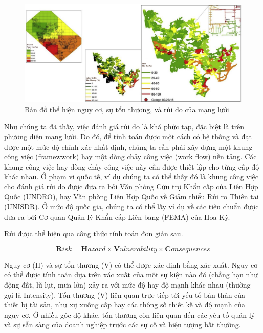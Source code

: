 \documentclass[utf8]{frontiersSCNS} %
\begin{document}
\FloatBarrier
\begin{figure}[h]
	\centering
	\begin{center}
		\includegraphics[width=15cm]{ruido}%
	\end{center}
	\caption{Bản đồ thể hiện nguy cơ, sự tổn thương, và rủi do của mạng lưới}\label{fig:2}
\end{figure}
\FloatBarrier

Như chúng ta đã thấy, việc đánh giá rủi do là khá phức tạp, đặc biệt là trên phương diện mạng lưới. Do đó, để tính toán được một cách có hệ thống và đạt được một mức độ chính xác nhất định, chúng ta cần phải xây dựng một khung công việc (framewwork) hay một dòng chảy công việc (work flow) nền tảng. Các khung công việc hay dòng chảy công việc này cần được thiết lập cho từng cấp độ khác nhau. Ở phạm vi quốc tế, ví dụ chúng ta có thể thấy đó là khung công việc cho đánh giá rủi do được đưa ra bởi Văn phòng Cứu trợ Khẩn cấp của Liên Hợp Quốc (UNDRO), hay Văn phòng Liên Hợp Quốc về Giảm thiểu Rủi ro Thiên tai (UNISDR). Ở mức độ quốc gia, chúng ta có thể lấy ví dụ về các tiêu chuẩn được đưa ra bởi Cơ quan Quản lý Khẩn cấp Liên bang (FEMA) của Hoa Kỳ.%

Rủi được thể hiện qua công thức tính toán đơn giản sau.

\begin{equation}\label{math01}
	\textbf{R}isk = \textbf{H}azard \times \textbf{V}ulnerability \times \textbf{C}onsequences
\end{equation}

Nguy cơ (H) và sự tổn thương (V) có thể được xác định bằng xác xuất. Nguy cơ có thể được tính toán dựa trên xác xuất của một sự kiện nào đó (chẳng hạn như động đất, lũ lụt, mưa lớn) xảy ra với mức độ hay độ mạnh khác nhau (thường gọi là Intensity). Tổn thương (V) liên quan trực tiếp tới yếu tố bản thân của thiết bị tài sản, như xự xuống cấp hay các thông số thiết kế và độ mạnh của nguy cơ. Ở nhiều góc độ khác, tổn thương còn liên quan đến các yêu tố quản lý và sự sẵn sàng của doanh nghiệp trước các sự cố và hiện tượng bất thường.
\end{document}

